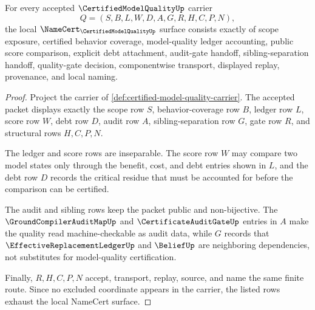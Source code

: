 \begin{theorem}
\label{thm:certified-model-quality-namecert-obligations}
For every accepted $\CertifiedModelQualityUp$ carrier
$$
Q=(S,B,L,W,D,A,G,R,H,C,P,N),
$$
the local $\NameCert_{\CertifiedModelQualityUp}$ surface consists exactly of scope exposure, certified behavior coverage, model-quality ledger accounting, public score comparison, explicit debt attachment, audit-gate handoff, sibling-separation handoff, quality-gate decision, componentwise transport, displayed replay, provenance, and local naming.
\end{theorem}
\begin{proof}
Project the carrier of \autoref{def:certified-model-quality-carrier}. The accepted packet displays exactly the scope row $S$, behavior-coverage row $B$, ledger row $L$, score row $W$, debt row $D$, audit row $A$, sibling-separation row $G$, gate row $R$, and structural rows $H,C,P,N$.

The ledger and score rows are inseparable. The score row $W$ may compare two model states only through the benefit, cost, and debt entries shown in $L$, and the debt row $D$ records the critical residue that must be accounted for before the comparison can be certified.

The audit and sibling rows keep the packet public and non-bijective. The $\GroundCompilerAuditMapUp$ and $\CertificateAuditGateUp$ entries in $A$ make the quality read machine-checkable as audit data, while $G$ records that $\EffectiveReplacementLedgerUp$ and $\BeliefUp$ are neighboring dependencies, not substitutes for model-quality certification.

Finally, $R,H,C,P,N$ accept, transport, replay, source, and name the same finite route. Since no excluded coordinate appears in the carrier, the listed rows exhaust the local NameCert surface.
\end{proof}


